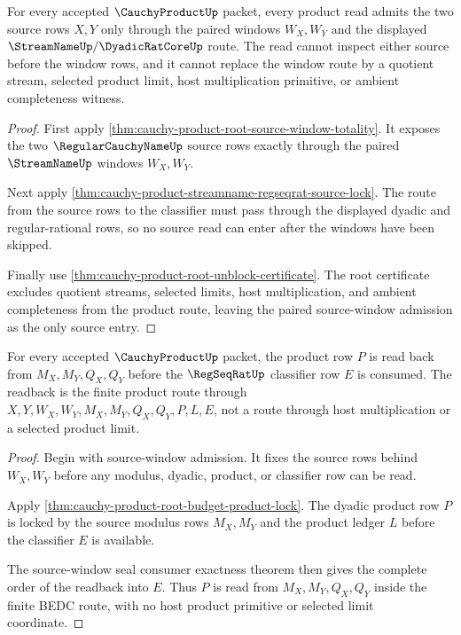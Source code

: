 \begin{theorem}
\label{thm:cauchyproduct-root-source-window-admission}
For every accepted $\CauchyProductUp$ packet, every product read admits the two source rows $X,Y$ only through the paired windows $W_X,W_Y$ and the displayed $\StreamNameUp/\DyadicRatCoreUp$ route. The read cannot inspect either source before the window rows, and it cannot replace the window route by a quotient stream, selected product limit, host multiplication primitive, or ambient completeness witness.
\end{theorem}
\begin{proof}
First apply \autoref{thm:cauchy-product-root-source-window-totality}. It exposes the two $\RegularCauchyNameUp$ source rows exactly through the paired $\StreamNameUp$ windows $W_X,W_Y$.

Next apply \autoref{thm:cauchy-product-streamname-regseqrat-source-lock}. The route from the source rows to the classifier must pass through the displayed dyadic and regular-rational rows, so no source read can enter after the windows have been skipped.

Finally use \autoref{thm:cauchy-product-root-unblock-certificate}. The root certificate excludes quotient streams, selected limits, host multiplication, and ambient completeness from the product route, leaving the paired source-window admission as the only source entry.
\end{proof}

\begin{theorem}
\label{thm:cauchyproduct-window-product-readback}
For every accepted $\CauchyProductUp$ packet, the product row $P$ is read back from $M_X,M_Y,Q_X,Q_Y$ before the $\RegSeqRatUp$ classifier row $E$ is consumed. The readback is the finite product route through $X,Y,W_X,W_Y,M_X,M_Y,Q_X,Q_Y,P,L,E$, not a route through host multiplication or a selected product limit.
\end{theorem}
\begin{proof}
Begin with source-window admission. It fixes the source rows behind $W_X,W_Y$ before any modulus, dyadic, product, or classifier row can be read.

Apply \autoref{thm:cauchy-product-root-budget-product-lock}. The dyadic product row $P$ is locked by the source modulus rows $M_X,M_Y$ and the product ledger $L$ before the classifier $E$ is available.

The source-window seal consumer exactness theorem then gives the complete order of the readback into $E$. Thus $P$ is read from $M_X,M_Y,Q_X,Q_Y$ inside the finite BEDC route, with no host product primitive or selected limit coordinate.
\end{proof}

